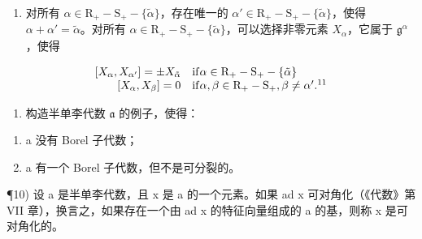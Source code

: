 \begin{enumerate}
\def\labelenumi{\alph{enumi})}
\setcounter{enumi}{2}
\tightlist
\item
  对所有 \(\alpha \in \mathrm{R}_{+} - \mathrm{S}_{+} - \{\tilde{\alpha}\}\)，存在唯一的 \(\alpha' \in \mathrm{R}_{+} - \mathrm{S}_{+} - \{\tilde{\alpha}\}\)，使得 \(\alpha + \alpha' = \tilde{\alpha}\)。对所有 \(\alpha \in \mathrm{R}_{+} - \mathrm{S}_{+} - \{\tilde{\alpha}\}\)，可以选择非零元素 \(X_{\alpha}\)，它属于 \(\mathfrak{g}^{\alpha}\)，使得
\end{enumerate}

\[
\begin{array}{r l} {[ X _ {\alpha}, X _ {\alpha^ {\prime}} ] = \pm X _ {\tilde {\alpha}}} & {\mathrm{if} \alpha \in \mathrm{R} _ {+} - \mathrm{S} _ {+} - \{\tilde {\alpha} \}} \\ {[ X _ {\alpha}, X _ {\beta} ] = 0} & {\mathrm{if} \alpha , \beta \in \mathrm{R} _ {+} - \mathrm{S} _ {+}, \beta \neq \alpha^ {\prime}. ^ {1 1}} \end{array}
\]


\begin{enumerate}
\def\labelenumi{\arabic{enumi})}
\setcounter{enumi}{8}
\tightlist
\item
  构造半单李代数 \(\mathfrak{a}\) 的例子，使得：
\end{enumerate}

\begin{enumerate}
\def\labelenumi{\roman{enumi})}
\item
  a 没有 Borel 子代数；
\item
  a 有一个 Borel 子代数，但不是可分裂的。
\end{enumerate}

¶10) 设 a 是半单李代数，且 x 是 a 的一个元素。如果 ad x 可对角化（《代数》第 VII 章），换言之，如果存在一个由 ad x 的特征向量组成的 a 的基，则称 x 是可对角化的。

